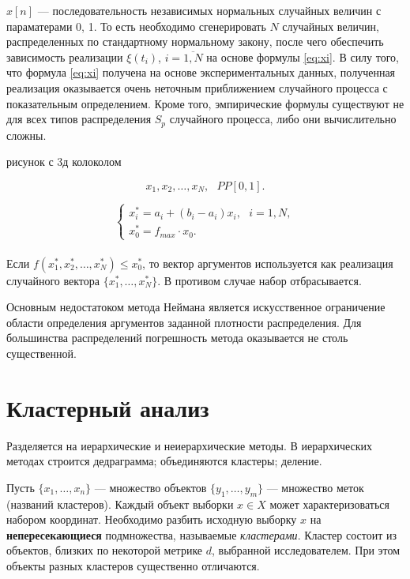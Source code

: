 \documentclass[12pt]{article}
\begin{document}
$x[n]$ --- последовательность независимых нормальных случайных величин с параматерами 0, 1. То есть необходимо сгенерировать $N$ случайных величин, распределенных по стандартному нормальному закону, после чего обеспечить зависимость реализации $\xi(t_i)$, $i = \overline{1, N}$ на основе формулы 
\eqref{eq:xi}. В силу того, что формула \eqref{eq:xi} получена на основе экспериментальных данных, полученная реализация оказывается очень неточным приближением случайного процесса с показательным определением. Кроме того, эмпирические формулы существуют не для всех типов распределения $S_p$ случайного процесса, либо они вычислительно сложны.

\begin{center} рисунок с 3д колоколом \end{center}

\[ x_1, x_2, \ldots, x_N,~~~PP[0,1].\]

\[
\begin{cases}
    x_i^* = a_i + (b_i - a_i) x_i, ~~~i = 1,N,\\
    x_0^* = f_{max} \cdot x_0.
\end{cases}
\]\\

Если $f(x_1^*, x_2^*, \ldots, x_N^*) \leq x_0^*$, то вектор аргументов используется как реализация случайного вектора $\{ x_1^*, \ldots, x_N^* \}$. В противом случае набор отбрасывается.

Основным недостатоком метода Неймана является искусственное ограничение области определения аргументов заданной плотности распределения. Для большинства распределений погрешность метода оказывается не столь существенной.

\newpage
\section{Кластерный анализ}
Разделяется на иерархические и неиерархические методы. В иерархических методах строится дедраграмма; объединяются кластеры; деление.

Пусть $\{ x_1, \ldots, x_n \}$ --- множество объектов $\{ y_1, \ldots, y_m \}$ --- множество меток (названий кластеров). Каждый объект выборки $x \in X$ может характеризоваться набором координат. Необходимо разбить исходную выборку $x$ на \textbf{непересекающиеся} подмножества, называемые \emph{кластерами}. Кластер состоит из объектов, близких по некоторой метрике $d$, выбранной исследователем. При этом объекты разных кластеров существенно отличаются.
\end{document}
